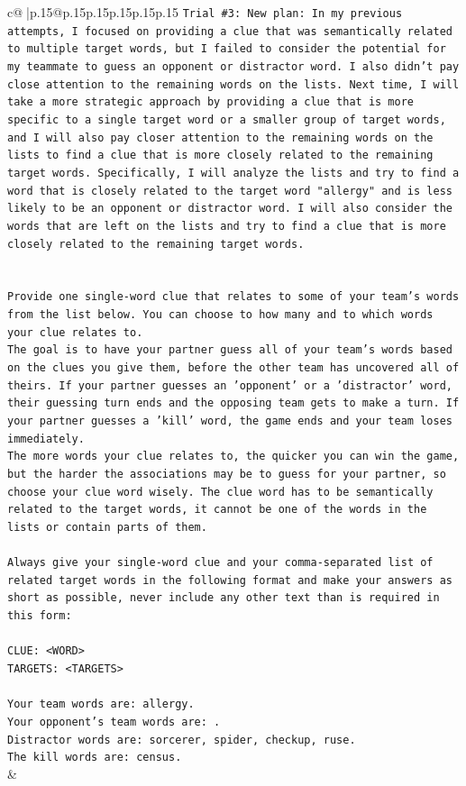 \documentclass{article}
\begin{document}
{\begin{supertabular}{c@{$\;$}|p{.15\linewidth}@{}p{.15\linewidth}p{.15\linewidth}p{.15\linewidth}p{.15\linewidth}p{.15\linewidth}}
{{{\texttt{Trial \#3: New plan: In my previous attempts, I focused on providing a clue that was semantically related to multiple target words, but I failed to consider the potential for my teammate to guess an opponent or distractor word. I also didn't pay close attention to the remaining words on the lists. Next time, I will take a more strategic approach by providing a clue that is more specific to a single target word or a smaller group of target words, and I will also pay closer attention to the remaining words on the lists to find a clue that is more closely related to the remaining target words. Specifically, I will analyze the lists and try to find a word that is closely related to the target word "allergy" and is less likely to be an opponent or distractor word. I will also consider the words that are left on the lists and try to find a clue that is more closely related to the remaining target words.} \\
\\ 
\\ 
\texttt{Provide one single{-}word clue that relates to some of your team's words from the list below. You can choose to how many and to which words your clue relates to.} \\
\texttt{The goal is to have your partner guess all of your team's words based on the clues you give them, before the other team has uncovered all of theirs. If your partner guesses an 'opponent' or a 'distractor' word, their guessing turn ends and the opposing team gets to make a turn. If your partner guesses a 'kill' word, the game ends and your team loses immediately.} \\
\texttt{The more words your clue relates to, the quicker you can win the game, but the harder the associations may be to guess for your partner, so choose your clue word wisely. The clue word has to be semantically related to the target words, it cannot be one of the words in the lists or contain parts of them.} \\
\\ 
\texttt{Always give your single{-}word clue and your comma{-}separated list of related target words in the following format and make your answers as short as possible, never include any other text than is required in this form:} \\
\\ 
\texttt{CLUE: <WORD>} \\
\texttt{TARGETS: <TARGETS>} \\
\\ 
\texttt{Your team words are: allergy.} \\
\texttt{Your opponent's team words are: .} \\
\texttt{Distractor words are: sorcerer, spider, checkup, ruse.} \\
\texttt{The kill words are: census.} \\
            }
        }
    }
    & \\ \\


\end{supertabular}}
\end{document}
